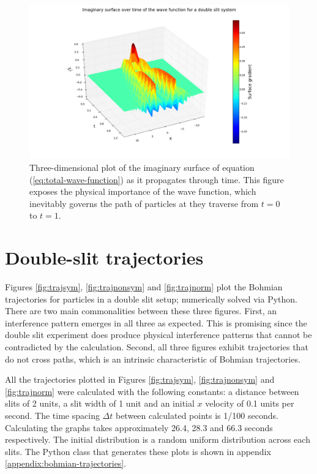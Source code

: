 \documentclass[10pt, reqno]{article}
\begin{document}
    \begin{figure}[!ht]
      \centerline{\includegraphics[scale=.4]{./imgs/double-slit-real-imaginary-parts-3d.png}}
      \caption{
        Three-dimensional plot of the imaginary surface of equation (\ref{eq:total-wave-function}) as it propagates through time.
        This figure exposes the physical importance of the wave function, which inevitably governs the path of particles at they traverse from $t=0$
      to $t=1$.
      }
      \label{fig:3d}
    \end{figure}

\section{Double-slit trajectories}

  Figures \ref{fig:trajsym}, \ref{fig:trajnonsym} and \ref{fig:trajnorm} plot the Bohmian trajectories for particles in a double slit setup; 
    numerically solved via Python.
  There are two main commonalities between these three figures.
  First, an interference pattern emerges in all three as expected. 
  This is promising since the double slit experiment does produce physical interference patterns that cannot be contradicted by the calculation.
  Second, all three figures exhibit trajectories that do not cross paths, which is an intrinsic characteristic of Bohmian trajectories.

  All the trajectories plotted in Figures \ref{fig:trajsym}, \ref{fig:trajnonsym} and \ref{fig:trajnorm} were calculated with the following constants:
    a distance between slits of 2 units, a slit width of 1 unit and an initial $x$ velocity of 0.1 units per second.
  The time spacing $\Delta t$ between calculated points is 1/100 seconds.
  Calculating the graphs takes approximately 26.4, 28.3 and 66.3 seconds respectively.
  The initial distribution is a random uniform distribution across each slits.
  The Python class that generates these plots is shown in appendix \ref{appendix:bohmian-trajectories}.
\end{document}
